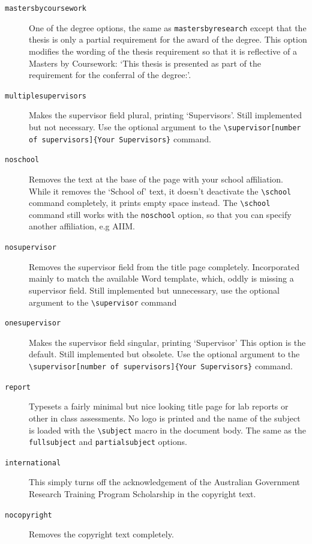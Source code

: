 \documentclass[12pt,oneside]{article}
\newcommand{\option}[1]{\texttt{\color{UOWblue}#1}}
\newcommand{\command}[1]{\texttt{\color{UOWred}#1}}
\newcommand{\comoptions}[1]{\texttt{\color{UOWdarkblue}#1}}
\begin{document}
\begin{description}
    \item[\option{mastersbycoursework}]
    One of the degree options, the same as \option{mastersbyresearch} except that the thesis is only a partial requirement for the award of the degree. This option modifies the wording of the thesis requirement so that it is reflective of a Masters by Coursework: `This thesis is presented as part of the requirement for the conferral of the degree:'.
    
    \item[\option{multiplesupervisors}]
    Makes the supervisor field plural, printing `Supervisors'. Still implemented but not necessary. Use the optional argument to the \command{\textbackslash{}supervisor}\option{[number of supervisors]}\comoptions{\{Your Supervisors\}} command.
    
    \item[\option{noschool}]
    Removes the text at the base of the page with your school affiliation. While it removes the `School of' text, it doesn't deactivate the \command{\textbackslash{}school} command completely, it prints empty space instead. The \command{\textbackslash{}school} command still works with the \option{noschool} option, so that you can specify another affiliation, e.g AIIM.
    
    \item[\option{nosupervisor}]
    Removes the supervisor field from the title page completely. Incorporated mainly to match the available Word template, which, oddly is missing a supervisor field. Still implemented but unnecessary, use the optional argument to the \command{\textbackslash{}supervisor} command
    
    \item[\option{onesupervisor}]
    Makes the supervisor field singular, printing `Supervisor' This option is the default. Still implemented but obsolete. Use the optional argument to the \command{\textbackslash{}supervisor}\option{[number of supervisors]}\comoptions{\{Your Supervisors\}} command.
    
    \item[\option{report}]
    Typesets a fairly minimal but nice looking title page for lab reports or other in class assessments. No logo is printed and the name of the subject is loaded with the \command{\textbackslash{}subject} macro in the document body. The same as the \option{fullsubject} and \option{partialsubject} options.
    
    \item[\option{international}]
    This simply turns off the acknowledgement of the Australian Government Research Training Program Scholarship in the copyright text.
    
    \item[\option{nocopyright}]
    Removes the copyright text completely.
    
\end{description}
\end{document}
